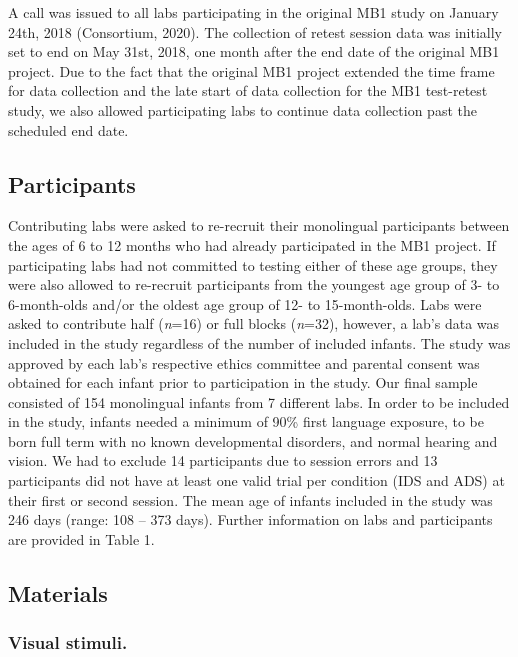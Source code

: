 \documentclass[
  english,
  man,floatsintext]{apa6}
\begin{document}
A call was issued to all labs participating in the original MB1 study on January 24th, 2018 (Consortium, 2020). The collection of retest session data was initially set to end on May 31st, 2018, one month after the end date of the original MB1 project. Due to the fact that the original MB1 project extended the time frame for data collection and the late start of data collection for the MB1 test-retest study, we also allowed participating labs to continue data collection past the scheduled end date.

\hypertarget{participants}{%
\subsection{Participants}\label{participants}}

Contributing labs were asked to re-recruit their monolingual participants between the ages of 6 to 12 months who had already participated in the MB1 project. If participating labs had not committed to testing either of these age groups, they were also allowed to re-recruit participants from the youngest age group of 3- to 6-month-olds and/or the oldest age group of 12- to 15-month-olds. Labs were asked to contribute half (\emph{n}=16) or full blocks (\emph{n}=32), however, a lab's data was included in the study regardless of the number of included infants. The study was approved by each lab's respective ethics committee and parental consent was obtained for each infant prior to participation in the study.
Our final sample consisted of 154 monolingual infants from 7 different labs. In order to be included in the study, infants needed a minimum of 90\% first language exposure, to be born full term with no known developmental disorders, and normal hearing and vision. We had to exclude 14 participants due to session errors and 13 participants did not have at least one valid trial per condition (IDS and ADS) at their first or second session. The mean age of infants included in the study was 246 days (range: 108 -- 373 days). Further information on labs and participants are provided in Table 1.

\hypertarget{materials}{%
\subsection{Materials}\label{materials}}

\hypertarget{visual-stimuli.}{%
\subsubsection{Visual stimuli.}\label{visual-stimuli.}}
\end{document}
